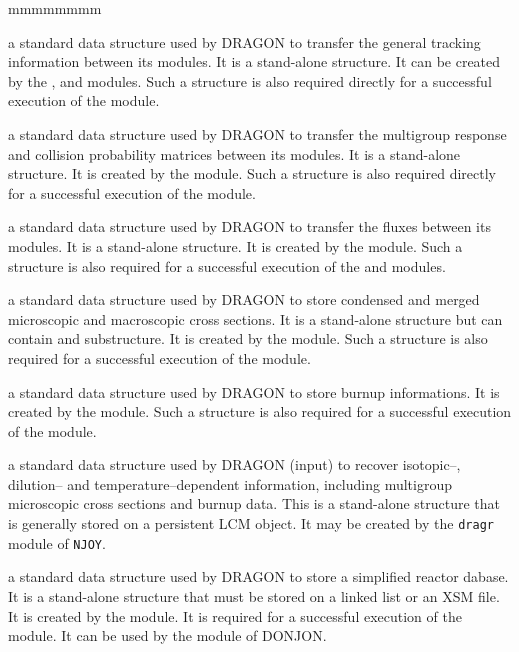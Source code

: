 \begin{ListeDeDescription}{mmmmmmmm}
\item[\dds{tracking}] a standard data structure used by DRAGON to transfer
the general tracking information between its modules. It is a stand-alone
structure. It can be created by the ,  and 
modules. Such a structure is also required directly for a successful execution of
the  module.

\item[\dds{asmpij}] a standard data structure used by DRAGON to transfer the
multigroup response and collision probability matrices between its modules. It
is a stand-alone structure. It is created by the  module. Such a
structure is also required directly for a successful execution of the
 module.

\item[\dds{fluxunk}] a standard data structure used by DRAGON to transfer the
fluxes  between its modules. It is a stand-alone structure. It is created
by the  module. Such a structure is also
required for a successful execution of the  and  modules.

\item[\dds{edition}] a standard data structure used by DRAGON to store
condensed and merged microscopic and macroscopic cross sections. It is a
stand-alone structure but can contain  and 
substructure. It is created by the  module. Such
a structure is also required for a successful execution of the 
module.

\item[\dds{burnup}] a standard data structure used by DRAGON to store
burnup informations. It is created by the  module.  Such
a structure is also required for a successful execution of the 
module.

\item[\dds{draglib}] a standard data structure used by DRAGON (input) to recover isotopic--, dilution--
and temperature--dependent information, including multigroup microscopic cross
sections and burnup data. This is a stand-alone structure that is generally
stored on a persistent LCM object. It may be created
by the {\tt dragr} module of {\tt NJOY}.

\item[\dds{cpo}] a standard data structure used by DRAGON to store
a simplified reactor dabase. It is a stand-alone structure that must be stored on a
linked list or an XSM file. It is created by the  module. It is required for a successful execution of the 
module. It can be used by the  module of DONJON.


\end{ListeDeDescription}
